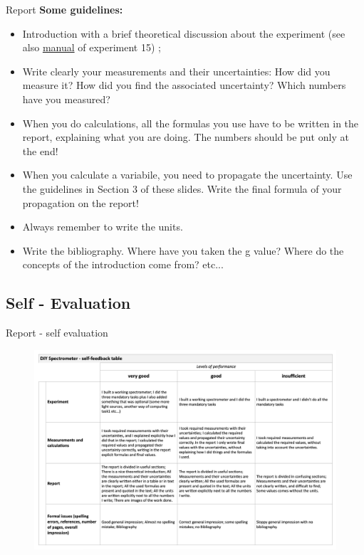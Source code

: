 \documentclass[9pt, xcolor=dvipsnames]{beamer}
\begin{document}
\begin{frame}{Report }
\textbf{Some guidelines:}
~\\
\begin{itemize}
    \item Introduction with a brief theoretical discussion about the experiment (see also \textcolor{blue}{\href{https://ap.phys.ethz.ch/Anleitungen/Bilingual/15_Manual.pdf}{manual}} of experiment 15) ;
    \item Write clearly your measurements and their uncertainties: How did you measure it? How did you find the associated uncertainty? Which numbers have you measured?
    \item When you do calculations, all the formulas you use have to be written in the report, explaining what you are doing. The numbers should be put only at the end!
    \item When you calculate a variabile, you need to propagate the uncertainty. Use the guidelines in Section 3 of these slides. Write the final formula of your propagation on the report!
    \item Always remember to write the units.  
    \item Write the bibliography. Where have you taken the g value? Where do the concepts of the introduction come from? etc...
\end{itemize}


\end{frame}
\subsection{Self - Evaluation }

\begin{frame}{Report - self evaluation}

\begin{figure}
		\begin{centering}
			\centering
			\includegraphics[width=1 \textwidth]{Figures/selffeedbacktable.png}
		\end{centering}
		\end{figure}

\end{frame}
\end{document}

